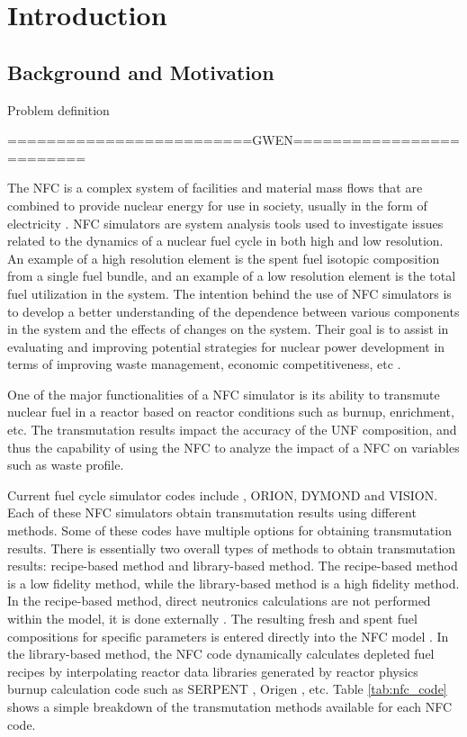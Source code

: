\section{Introduction}
\subsection{Background and Motivation}
Problem definition

=========================GWEN=========================

The \gls{NFC} is a complex system of facilities and material 
mass flows that are combined to provide nuclear energy for use 
in society, usually in the form of electricity 
\cite{yacout_modeling_2005}. 
\gls{NFC} simulators are system analysis tools used to investigate 
issues related to the dynamics of a nuclear fuel cycle in both 
high and low resolution. 
An example of a high resolution element is the spent fuel 
isotopic composition from a single fuel bundle, and an example 
of a low resolution element is the total fuel utilization in 
the system. 
The intention behind the use of \gls{NFC} simulators is to develop 
a better understanding of the dependence between various components 
in the system and the effects of changes on the system. 
Their goal is to assist in evaluating and improving potential 
strategies for nuclear power development in terms of improving waste 
management, economic competitiveness, etc \cite{yacout_modeling_2005}.   

One of the major functionalities of a \gls{NFC} simulator is its 
ability to transmute nuclear fuel in a reactor based on reactor 
conditions such as burnup, enrichment, etc. 
The transmutation results impact the accuracy of the \gls{UNF} 
composition, and thus the capability of using the \gls{NFC} to 
analyze the impact of a \gls{NFC} on variables such as waste profile.  

Current fuel cycle simulator codes include \Cyclus, ORION, DYMOND 
and VISION. 
Each of these NFC simulators obtain transmutation results using 
different methods. 
Some of these codes have multiple options for obtaining 
transmutation results. 
There is essentially two overall types of methods to obtain transmutation 
results: recipe-based method and library-based method. 
The recipe-based method is a low fidelity method, while the library-based method is 
a high fidelity method. 
In the recipe-based method, direct neutronics calculations are not performed 
within the model, it is done externally \cite{yacout_vision_2006}. 
The resulting fresh and spent fuel compositions for specific parameters 
is entered directly into the \gls{NFC} model \cite{sunny_transition_2015}. 
In the library-based method,  the \gls{NFC} code dynamically calculates depleted 
fuel recipes by interpolating reactor data libraries generated by
reactor physics burnup calculation code such as SERPENT 
\cite{leppanen_serpent_2013}, Origen \cite{croff_users_1980}, etc. 
Table \ref{tab:nfc_code} shows a simple breakdown of the 
transmutation methods available for each \gls{NFC} code. 

